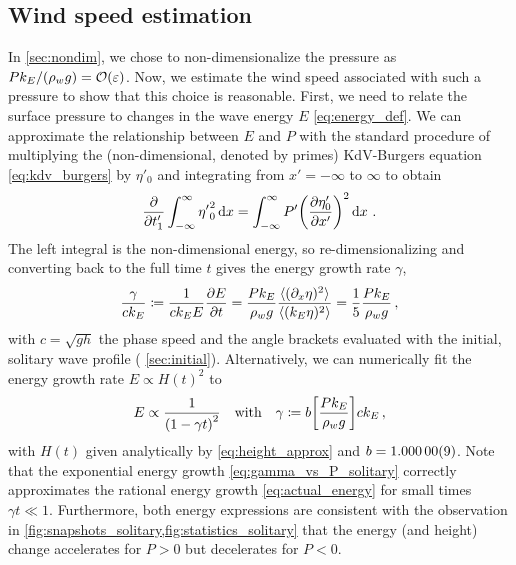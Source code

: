 \documentclass{jfm}
\renewcommand*{\epsilon}{\varepsilon}
\begin{document}
\subsection{\label{sec:press_mag} Wind speed estimation}
In \cref{sec:nondim}, we chose to non-dimensionalize the pressure as $P
k_E/(\rho_w g) = \order{\epsilon}$.
Now, we estimate the wind speed associated with such a pressure
to show that this choice is reasonable.
First, we need to relate the surface pressure to changes in the wave
energy $E$ \cref{eq:energy_def}.
We can approximate the relationship between $E$ and $P$ with the
standard procedure \citep[\eg][]{mei2005nonlinear} of multiplying the
(non-dimensional, denoted by primes) KdV-Burgers equation
\cref{eq:kdv_burgers} by $\eta'_0$ and integrating from $x'=-\infty$ to
$\infty$ to obtain
\begin{equation}
  \pdv{t'_1} \int_{-\infty}^{\infty} {\eta'}_0^2 \dd{x}
  = \int_{-\infty}^{\infty} P' \pqty{\pdv{\eta'_0}{x'}}^2
  \dd{x} \,.
\end{equation}
The left integral is the non-dimensional energy, so re-dimensionalizing
and converting back to the full time $t$ gives the energy growth rate
$\gamma$,
\begin{equation}
  \frac{\gamma}{c k_E} \coloneqq
  \frac{1}{c k_E E} \pdv{E}{t}
  = \frac{P k_E}{\rho_w g} \frac{\langle (\partial_x \eta)^2 \rangle}
    {\langle (k_E \eta)^2 \rangle}
  = \frac{1}{5} \frac{P k_E}{\rho_w g}
  \,,
  \label{eq:gamma_vs_P_solitary}
\end{equation}
with $c = \sqrt{gh}$ the phase speed and the angle brackets evaluated
with the initial, solitary wave profile (\cf{} \cref{sec:initial}).
Alternatively, we can numerically fit the energy growth rate
$E \propto H(t)^2$ to
\begin{equation}
  E \propto \frac{1}{\pqty{1 - \gamma t}^2}
  \qq{with}
  \gamma \coloneqq b \bqty{\frac{P k_E}{\rho_w g}} c k_E
  \,,
  \label{eq:actual_energy}
\end{equation}
with $H(t)$ given analytically by \cref{eq:height_approx} and $b =
\num{1.00000 \pm 0.00009}$.
Note that the exponential energy growth \cref{eq:gamma_vs_P_solitary}
correctly approximates the rational energy growth
\cref{eq:actual_energy} for small times $\gamma t \ll 1$.
Furthermore, both energy expressions are consistent with the observation
in \cref{fig:snapshots_solitary,fig:statistics_solitary} that the energy
(and height) change accelerates for $P>0$ but decelerates for $P<0$.
\end{document}
